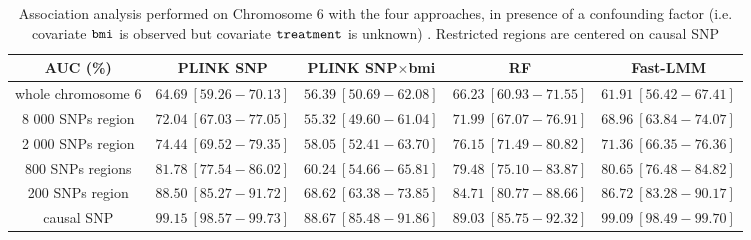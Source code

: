 \documentclass[10pt,a4paper]{article}
\begin{document}
\begin{table}
\begin{center}
\small
\begin{tabular}{ccccc}
\hline
AUC (\%) & PLINK SNP & PLINK SNP$\times$bmi & RF & Fast-LMM \\
\hline
whole chromosome 6 &$64.69\ [59.26-70.13]$ & $56.39\ [50.69-62.08]$ & $66.23\ [60.93-71.55]$ &$61.91\ [56.42-67.41]$  \\
8 000 SNPs region &$72.04\ [67.03-77.05]$ & $55.32\ [49.60-61.04]$ & $71.99\ [67.07-76.91]$  & $68.96\ [63.84-74.07]$\\
2 000 SNPs region &$74.44\ [69.52-79.35]$ &  $58.05\ [52.41-63.70]$ &  $76.15\ [71.49-80.82]$ &$71.36\ [66.35-76.36]$\\
800 SNPs regions &$81.78\ [77.54-86.02]$&  $60.24\ [54.66-65.81]$ & $79.48\ [75.10-83.87]$ &$80.65\ [76.48-84.82] $\\
200 SNPs region &$88.50\ [85.27-91.72]$ & $68.62\ [63.38-73.85]$ &  $84.71\ [80.77-88.66]$ &$86.72\ [83.28-90.17]$ \\
causal SNP & $99.15\ [98.57-99.73]$& $88.67\ [85.48-91.86]$ & $89.03\ [85.75-92.32]$ &$99.09\ [98.49-99.70] $\\
\hline
\end{tabular}
\end{center}
\caption{\label{tab-auc-bmi} Association analysis performed on Chromosome 6 with the four approaches, in presence of a confounding factor (i.e. covariate $\tt{bmi}$ is observed but covariate $\tt{treatment}$ is unknown) . Restricted regions are centered on causal SNP}
\end{table}
\end{document}
